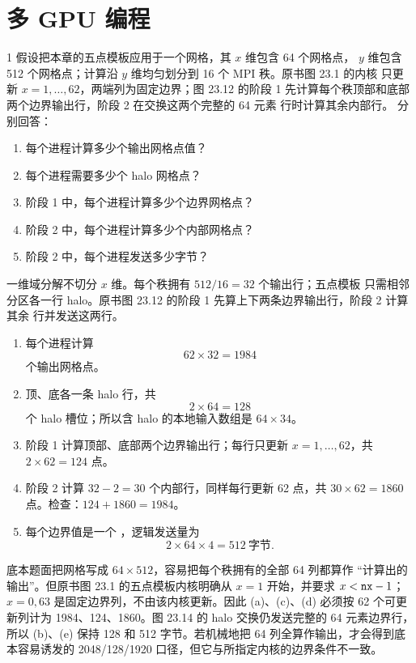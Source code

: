 \chapter{多 GPU 编程}

\begin{solutionexercise}{1}
\problemheading 假设把本章的五点模板应用于一个网格，其 $x$ 维包含 64 个网格点，
$y$ 维包含 512 个网格点；计算沿 $y$ 维均匀划分到 16 个 MPI 秩。原书图 23.1 的内核
只更新 $x=1,\ldots,62$，两端列为固定边界；图 23.12 的阶段 1 先计算每个秩顶部和底部
两个边界输出行，阶段 2 在交换这两个完整的 64 元素  行时计算其余内部行。
分别回答：
\begin{enumerate}[label=(\alph*)]
  \item 每个进程计算多少个输出网格点值？
  \item 每个进程需要多少个 halo 网格点？
  \item 阶段 1 中，每个进程计算多少个边界网格点？
  \item 阶段 2 中，每个进程计算多少个内部网格点？
  \item 阶段 2 中，每个进程发送多少字节？
\end{enumerate}

\approachheading 一维域分解不切分 $x$ 维。每个秩拥有 $512/16=32$ 个输出行；五点模板
只需相邻分区各一行 halo。原书图 23.12 的阶段 1 先算上下两条边界输出行，阶段 2 计算其余
行并发送这两行。

\answerheading
\begin{enumerate}[label=(\alph*)]
  \item 每个进程计算
  \[
    62\times32=1984
  \]
  个输出网格点。
  \item 顶、底各一条 halo 行，共
  \[
    2\times64=128
  \]
  个 halo 槽位；所以含 halo 的本地输入数组是 $64\times34$。
  \item 阶段 1 计算顶部、底部两个边界输出行；每行只更新 $x=1,\ldots,62$，共
  $2\times62=124$ 点。
  \item 阶段 2 计算 $32-2=30$ 个内部行，同样每行更新 62 点，共
  $30\times62=1860$ 点。检查：$124+1860=1984$。
  \item 每个边界值是一个 ，逻辑发送量为
  \[
    2\times64\times4=512\ \text{字节}.
  \]
\end{enumerate}
\editorialnote 底本题面把网格写成 $64\times512$，容易把每个秩拥有的全部 64 列都算作
“计算出的输出”。但原书图 23.1 的五点模板内核明确从 $x=1$ 开始，并要求
$x<\code{nx}-1$；$x=0,63$ 是固定边界列，不由该内核更新。因此 (a)、(c)、(d) 必须按
62 个可更新列计为 1984、124、1860。图 23.14 的 halo 交换仍发送完整的 64 元素边界行，
所以 (b)、(e) 保持 128 和 512 字节。若机械地把 64 列全算作输出，才会得到底本容易诱发的
2048/128/1920 口径，但它与所指定内核的边界条件不一致。


\end{solutionexercise}
